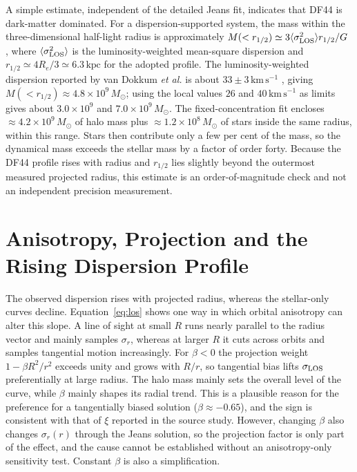 \documentclass[12pt,a4paper]{report}
\numberwithin{equation}{chapter}
\begin{document}
A simple estimate, independent of the detailed Jeans fit, indicates that DF44 is dark-matter dominated. For a dispersion-supported system, the mass within the three-dimensional half-light radius is approximately $M(<r_{1/2})\simeq3\langle\sigma_{\rm LOS}^2\rangle r_{1/2}/G$ \cite{wolf2010}, where $\langle\sigma_{\rm LOS}^2\rangle$ is the luminosity-weighted mean-square dispersion and $r_{1/2}\simeq4R_e/3\simeq6.3\,\mathrm{kpc}$ for the adopted profile. The luminosity-weighted dispersion reported by van Dokkum \emph{et al.} is about $33\pm3\,\mathrm{km\,s^{-1}}$ \cite{vandokkumdf44_2019}, giving $M(<r_{1/2})\approx4.8\times10^9\,M_\odot$; using the local values $26$ and $40\,\mathrm{km\,s^{-1}}$ as limits gives about $3.0\times10^9$ and $7.0\times10^9\,M_\odot$. The fixed-concentration fit encloses $\approx4.2\times10^9\,M_\odot$ of halo mass plus $\approx1.2\times10^8\,M_\odot$ of stars inside the same radius, within this range. Stars then contribute only a few per cent of the mass, so the dynamical mass exceeds the stellar mass by a factor of order forty. Because the DF44 profile rises with radius and $r_{1/2}$ lies slightly beyond the outermost measured projected radius, this estimate is an order-of-magnitude check and not an independent precision measurement.

\section{Anisotropy, Projection and the Rising Dispersion Profile}

The observed dispersion rises with projected radius, whereas the stellar-only curves decline. Equation~\eqref{eq:los} shows one way in which orbital anisotropy can alter this slope. A line of sight at small $R$ runs nearly parallel to the radius vector and mainly samples $\sigma_r$, whereas at larger $R$ it cuts across orbits and samples tangential motion increasingly. For $\beta<0$ the projection weight $1-\beta R^2/r^2$ exceeds unity and grows with $R/r$, so tangential bias lifts $\sigma_{\rm LOS}$ preferentially at large radius. The halo mass mainly sets the overall level of the curve, while $\beta$ mainly shapes its radial trend. This is a plausible reason for the preference for a tangentially biased solution ($\beta\approx-0.65$), and the sign is consistent with that of $\xi$ reported in the source study. However, changing $\beta$ also changes $\sigma_r(r)$ through the Jeans solution, so the projection factor is only part of the effect, and the cause cannot be established without an anisotropy-only sensitivity test. Constant $\beta$ is also a simplification.
\end{document}
